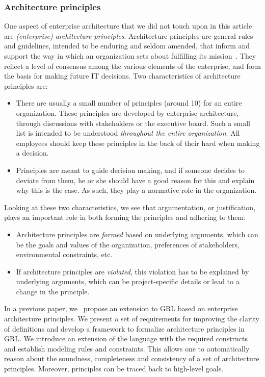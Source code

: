 \subsubsection*{Architecture principles} 
One aspect of enterprise architecture that we did not touch upon in this article are \emph{(enterprise) architecture principles}. Architecture principles are general rules and guidelines, intended to be enduring and seldom amended, that inform and support the way in which an organization sets about fulfilling its mission~\cite{Lankhorst2005,OptLand2007a,OG2009}. They reflect a level of consensus among the various elements of the enterprise, and form the basis for making future IT decisions. Two characteristics of architecture principles are:
\begin{itemize}
\item There are usually a small number of principles (around 10) for an entire organization. These principles are developed by enterprise architecture, through discussions with stakeholders or the executive board. Such a small list is intended to be understood \emph{throughout the entire organization}. All employees should keep these principles in the back of their hard when making a decision.
\item Principles are meant to guide decision making, and if someone decides to deviate from them, he or she should have a good reason for this and explain why this is the case. As such, they play a normative role in the organization.
\end{itemize}

Looking at these two characteristics, we see that argumentation, or justification, plays an important role in both forming the principles and adhering to them:
\begin{itemize}
\item Architecture principles are \emph{formed} based on underlying arguments, which can be the goals and values of the organization, preferences of stakeholders, environmental constraints, etc.
\item If architecture principles are \emph{violated}, this violation has to be explained by underlying arguments, which can be project-specific details or lead to a change in the principle.
\end{itemize}

In a previous paper, we~\cite{marosin-etal:caise2016} propose an extension to GRL based on enterprise architecture principles. We present a set of requirements for improving the clarity of definitions and develop a framework to formalize architecture principles in GRL. We introduce an extension of the language with the required constructs and establish modeling rules and constraints. This allows one to automatically reason about the soundness, completeness and consistency of a set of architecture principles. Moreover, principles can be traced back to high-level goals.

